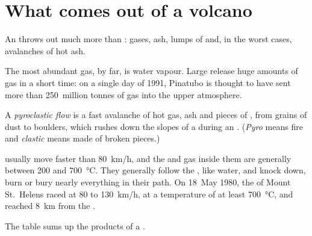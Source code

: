 \section{What comes out of a volcano}

An  throws out much more than : gases, ash, lumps of  and,
in the worst cases, avalanches of hot ash.

The most abundant gas, by far, is water vapour. Large  release
huge amounts of gas in a short time: on a single day of 1991, Pinatubo is
thought to have sent more than 250~million tonnes of gas into the upper
atmosphere.

\begin{definition}\label{def:g7:volcanoes:pyroclastic-flow}
A \emph{pyroclastic flow} is a fast avalanche of
hot gas, ash and pieces of , from grains of dust to boulders, which
rushes down the slopes of a  during an .
(\emph{Pyro} means fire and \emph{clastic} means made of broken pieces.)
\end{definition}

 usually move faster than \qty{80}{km/h}, and the 
and gas inside them are generally between 200 and \qty{700}{\degreeCelsius}.
They generally follow the , like water, and knock down, burn or
bury nearly everything in their path. On 18~May 1980, the  of Mount
St.~Helens raced at 80 to \qty{130}{km/h}, at a temperature of at least
\qty{700}{\degreeCelsius}, and reached \qty{8}{km} from the .

The table sums up the products of a .

